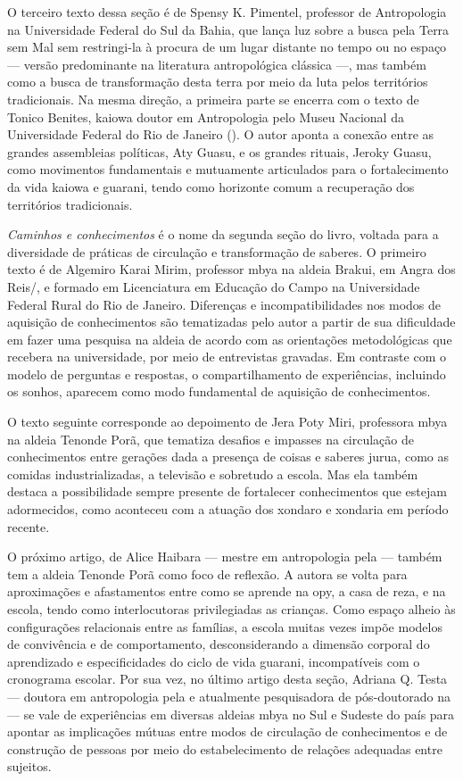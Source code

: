 O terceiro texto dessa seção é de Spensy K. Pimentel, professor de
Antropologia na Universidade Federal do Sul da Bahia, que lança luz
sobre a busca pela Terra sem Mal sem restringi-la à procura de um lugar
distante no tempo ou no espaço — versão predominante na literatura
antropológica clássica —, mas também como a busca de transformação
desta terra por meio da luta pelos territórios tradicionais. Na mesma
direção, a primeira parte se encerra com o texto de Tonico Benites,
kaiowa doutor em Antropologia pelo Museu Nacional da Universidade
Federal do Rio de Janeiro (). O autor aponta a conexão entre as
grandes assembleias políticas, Aty Guasu, e os grandes rituais, Jeroky
Guasu, como movimentos fundamentais e mutuamente articulados para o
fortalecimento da vida kaiowa e guarani, tendo como horizonte comum a
recuperação dos territórios tradicionais.

\emph{Caminhos e conhecimentos} é o nome da segunda seção do livro, voltada
para a diversidade de práticas de circulação e transformação de
saberes. O primeiro texto é de Algemiro Karai Mirim, professor mbya na
aldeia Brakui, em Angra dos Reis/, e formado em Licenciatura em
Educação do Campo na Universidade Federal Rural do Rio de Janeiro.
Diferenças e incompatibilidades nos modos de aquisição de conhecimentos
são tematizadas pelo autor a partir de sua dificuldade em fazer uma
pesquisa na aldeia de acordo com as orientações metodológicas que
recebera na universidade, por meio de entrevistas gravadas. Em
contraste com o modelo de perguntas e respostas, o compartilhamento de
experiências, incluindo os sonhos, aparecem como modo fundamental de
aquisição de conhecimentos. 

O texto seguinte corresponde ao depoimento de Jera Poty Miri, professora
mbya na aldeia Tenonde Porã, que tematiza desafios e impasses na
circulação de conhecimentos entre gerações dada a presença de coisas e
saberes jurua, como as comidas industrializadas, a televisão e
sobretudo a escola. Mas ela também destaca a possibilidade sempre
presente de fortalecer conhecimentos que estejam adormecidos, como
aconteceu com a atuação dos xondaro e xondaria em período recente. 

O próximo artigo, de Alice Haibara — mestre em antropologia pela  —
também tem a aldeia Tenonde Porã como foco de reflexão. A autora se
volta para aproximações e afastamentos entre como se aprende na opy, a
casa de reza, e na escola, tendo como interlocutoras privilegiadas as
crianças. Como espaço alheio às configurações relacionais entre as
famílias, a escola muitas vezes impõe modelos de convivência e de
comportamento, desconsiderando a dimensão corporal do aprendizado e
especificidades do ciclo de vida guarani, incompatíveis com o
cronograma escolar. Por sua vez, no último artigo desta seção, Adriana
Q. Testa — doutora em antropologia pela  e atualmente pesquisadora
de pós-doutorado na  — se vale de experiências em diversas
aldeias mbya no Sul e Sudeste do país para apontar as implicações
mútuas entre modos de circulação de conhecimentos e de construção de
pessoas por meio do estabelecimento de relações adequadas entre
sujeitos. 

